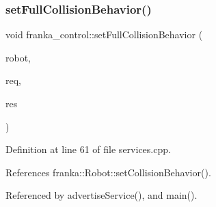 \subsubsection{\texorpdfstring{set\+Full\+Collision\+Behavior()}{setFullCollisionBehavior()}}
{\footnotesize\ttfamily void franka\+\_\+control\+::set\+Full\+Collision\+Behavior (\begin{DoxyParamCaption}\item[{\hyperlink{classfranka_1_1Robot}{franka\+::\+Robot} \&}]{robot,  }\item[{const Set\+Full\+Collision\+Behavior\+::\+Request \&}]{req,  }\item[{Set\+Full\+Collision\+Behavior\+::\+Response \&}]{res }\end{DoxyParamCaption})}



Definition at line 61 of file services.\+cpp.



References franka\+::\+Robot\+::set\+Collision\+Behavior().



Referenced by advertise\+Service(), and main().


